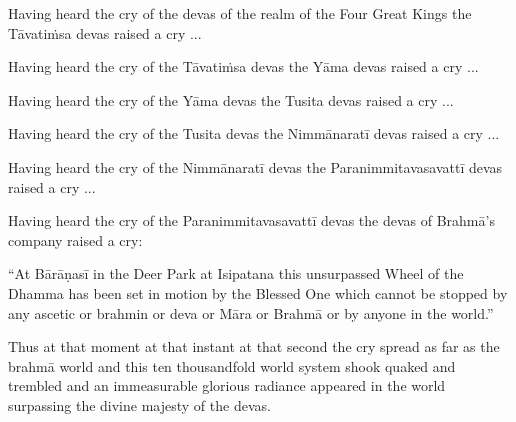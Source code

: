 \medskip

\begin{english-only-hang}
  Having heard the cry of the devas of the realm of the Four Great Kings the Tāvatiṁsa devas raised a cry ...
\end{english-only-hang}

\medskip

\begin{english-only-hang}
  Having heard the cry of the Tāvatiṁsa devas the Yāma devas raised a cry ...
\end{english-only-hang}

\medskip

\begin{english-only-hang}
  Having heard the cry of the Yāma devas the Tusita devas raised a cry ...
\end{english-only-hang}

\medskip

\begin{english-only-hang}
  Having heard the cry of the Tusita devas the Nimmānaratī devas raised a cry ...
\end{english-only-hang}

\medskip

\begin{english-only-hang}
  Having heard the cry of the Nimmānaratī devas the Paranimmitavasavattī devas raised a cry ...
\end{english-only-hang}

\medskip

\begin{english-only-hang}
  Having heard the cry of the Paranimmitavasavattī devas the devas of Brahmā's company raised a cry:
\end{english-only-hang}

\medskip

\begin{english-only-hang}
  ``At Bārāṇasī in the Deer Park at Isipatana this unsurpassed Wheel of the Dhamma has been set in motion by the Blessed One which cannot be stopped by any ascetic or brahmin or deva or Māra or Brahmā or by anyone in the world.''
\end{english-only-hang}

\medskip

\begin{english-only-hang}
  Thus at that moment at that instant at that second the cry spread as far as the brahmā world and this ten thousandfold world system shook quaked and trembled and an immeasurable glorious radiance appeared in the world surpassing the divine majesty of the devas.
\end{english-only-hang}

